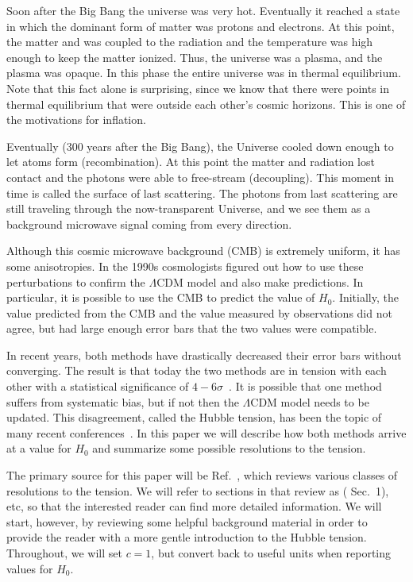 \documentclass[12pt]{article}
\renewcommand{\L}{$\Lambda$}
\newcommand{\val}[1]{\cite{DiValentino2021} Sec.~#1}
\begin{document}
Soon after the Big Bang the universe was very hot. Eventually it reached a state in which the dominant form of matter was protons and electrons. At this point, the matter and was coupled to the radiation and the temperature was high enough to keep the matter ionized. Thus, the universe was a plasma, and the plasma was opaque.
In this phase the entire universe was in thermal equilibrium. Note that this fact alone is surprising, since we know that there were points in thermal equilibrium that were outside each other's cosmic horizons. This is one of the motivations for inflation. 

Eventually (300 years after the Big Bang), the Universe cooled down enough to let atoms form (recombination). At this point the matter and radiation lost contact and the photons were able to free-stream (decoupling). This moment in time is called the surface of last scattering.  The photons from last scattering are still traveling through the now-transparent Universe, and we see them as a background microwave signal coming from every direction.

Although this cosmic microwave background (CMB) is extremely uniform, it has some anisotropies. In the 1990s cosmologists figured out how to use these perturbations to confirm the \L CDM model and also make predictions. In particular, it is possible to use the CMB to predict the value of $H_0$. Initially, the value predicted from the CMB and the value measured by observations did not agree, but had large enough error bars that the two values were compatible. 

In recent years, both methods have drastically decreased their error bars without converging. The result is that today the two methods are in tension with each other with a statistical significance of $4-6\sigma$~\cite{DiValentino2021}. It is possible that one method suffers from systematic bias, but if not then the \L CDM model needs to be updated. This disagreement, called the Hubble tension, has been the topic of many recent conferences~\cite{Verde2019, DiValentino2020}.  In this paper we will describe how both methods arrive at a value for $H_0$ and summarize some possible resolutions to the tension.

The primary source for this paper will be Ref.~\cite{DiValentino2021}, which reviews various classes of resolutions to the tension. We will refer to sections in that review as (\val{1}), etc, so that the interested reader can find more detailed information. We will start, however, by reviewing some helpful background material in order to provide the reader with a more gentle introduction to the Hubble tension. Throughout, we will set $c = 1$, but convert back to useful units when reporting values for $H_0$.
\end{document}
